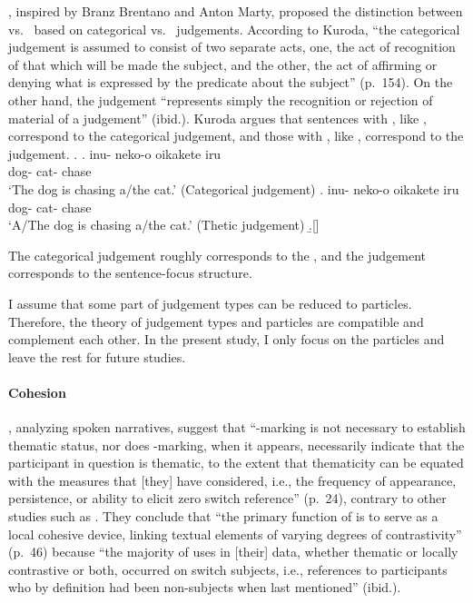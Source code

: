 ,
inspired by Branz Brentano and Anton Marty,
proposed the distinction between  vs.~
based on categorical vs.~ judgements.
According to Kuroda,
``the categorical judgement is assumed to consist of two separate acts,
one, the act of recognition of that which will be made the subject,
and the other, the act of affirming or denying what is expressed by the predicate about the subject'' (p.~154).
On the other hand,
the  judgement ``represents simply the recognition or rejection of material of a judgement'' (ibid.).
Kuroda argues that
sentences with , like \Next[a], correspond to the categorical judgement, and
those with , like \Next[b], correspond to the  judgement.
%
\ex.
 \ag. inu- neko-o oikakete iru \\
      dog- cat- chase  \\
      `The dog is chasing a/the cat.'
      \hfill{(Categorical judgement)}
 \bg. inu- neko-o oikakete iru \\
      dog- cat- chase  \\
      `A/The dog is chasing a/the cat.'
      \hfill{(Thetic judgement)}
 \b.[] \hfill{\cite[161]{kuroda72}}

The categorical judgement roughly corresponds to the , and
the  judgement corresponds to the sentence-focus structure.

I assume that some part of judgement types can be reduced to particles.
Therefore, the theory of judgement types and particles are compatible and complement each other.
In the present study,
I only focus on the particles
and leave the rest for future studies.

\paragraph{Cohesion}

,
analyzing spoken narratives, suggest that
``-marking is not necessary to establish thematic status, nor does -marking, when it appears, necessarily indicate that the participant in question is thematic, to the extent that
thematicity can be equated with the measures that [they] have considered,
i.e., the frequency of appearance, persistence, or ability to elicit zero switch reference'' (p.~24),
contrary to other studies such as .
They conclude that
``the primary function of  is to serve as a local cohesive device,
linking textual elements of varying degrees of contrastivity'' (p.~46)
because ``the majority of  uses in [their] data,
whether thematic or locally contrastive or both,
occurred on switch subjects,
i.e., references to participants who by definition had been non-subjects when last mentioned'' (ibid.).

